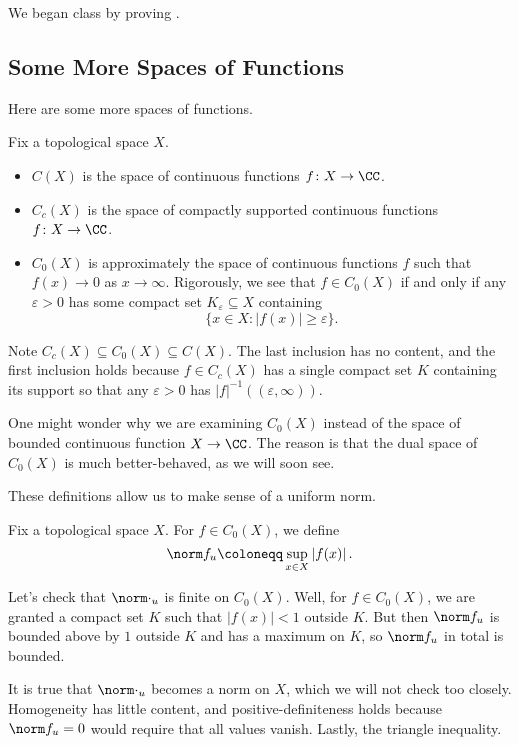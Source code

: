 \documentclass[../notes.tex]{subfiles}
\begin{document}
We began class by proving .

\subsection{Some More Spaces of Functions}
Here are some more spaces of functions.
\begin{definition}
	Fix a topological space $X$.
	\begin{itemize}
		\item $C(X)$ is the space of continuous functions $f\colon X\to\CC$.
		\item $C_c(X)$ is the space of compactly supported continuous functions $f\colon X\to\CC$.
		\item $C_0(X)$ is approximately the space of continuous functions $f$ such that $f(x)\to0$ as $x\to\infty$. Rigorously, we see that $f\in C_0(X)$ if and only if any $\varepsilon>0$ has some compact set $K_\varepsilon\subseteq X$ containing
		\[\{x\in X:\left|f(x)\right|\ge\varepsilon\}.\]
	\end{itemize}
\end{definition}
\begin{remark}
	Note $C_c(X)\subseteq C_0(X)\subseteq C(X)$. The last inclusion has no content, and the first inclusion holds because $f\in C_c(X)$ has a single compact set $K$ containing its support so that any $\varepsilon>0$ has $\left|f\right|^{-1}((\varepsilon,\infty))$.
\end{remark}
\begin{remark} \label{rem:want-duals}
	One might wonder why we are examining $C_0(X)$ instead of the space of bounded continuous function $X\to\CC$. The reason is that the dual space of $C_0(X)$ is much better-behaved, as we will soon see.
\end{remark}
These definitions allow us to make sense of a uniform norm.
\begin{definition}
	Fix a topological space $X$. For $f\in C_0(X)$, we define
	\[\norm f_u\coloneqq\sup_{x\in X}\left|f(x)\right|.\]
\end{definition}
\begin{remark}
	Let's check that $\norm\cdot_u$ is finite on $C_0(X)$. Well, for $f\in C_0(X)$, we are granted a compact set $K$ such that $\left|f(x)\right|<1$ outside $K$. But then $\norm f_u$ is bounded above by $1$ outside $K$ and has a maximum on $K$, so $\norm f_u$ in total is bounded.
\end{remark}
\begin{remark} \label{rem:uniform-norm-is-norm}
	It is true that $\norm\cdot_u$ becomes a norm on $X$, which we will not check too closely. Homogeneity has little content, and positive-definiteness holds because $\norm f_u=0$ would require that all values vanish. Lastly, the triangle inequality.
\end{remark}
\end{document}

